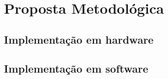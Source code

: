 \chapter[Proposta Metodológica]{Proposta Metodológica}

\section{Implementação em hardware}



\section{Implementação em software}


